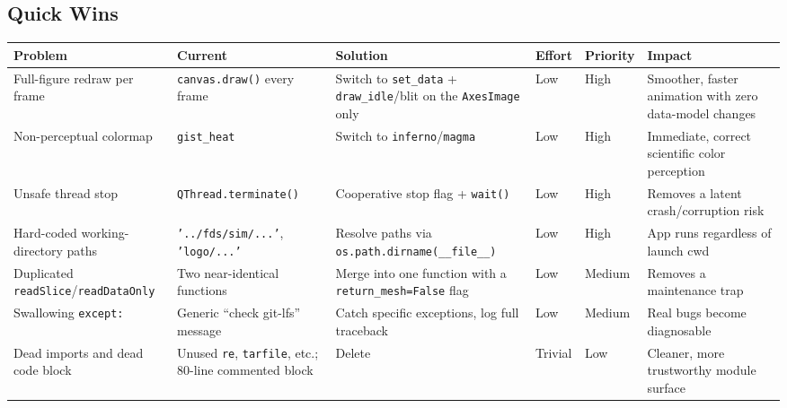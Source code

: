 \documentclass[11pt,a4paper]{report}
\begin{document}
\begin{landscape}
\section{Quick Wins}
\begin{longtable}{p{2.6cm}p{3.4cm}p{3.4cm}p{1.4cm}p{1.2cm}p{2.6cm}}
\toprule
\textbf{Problem} & \textbf{Current} & \textbf{Solution} & \textbf{Effort} & \textbf{Priority} & \textbf{Impact} \\
\midrule
Full-figure redraw per frame & \texttt{canvas.draw()} every frame & Switch to \texttt{set\_data} + \texttt{draw\_idle}/blit on the \texttt{AxesImage} only & Low & High & Smoother, faster animation with zero data-model changes \\
Non-perceptual colormap & \texttt{gist\_heat} & Switch to \texttt{inferno}/\texttt{magma} & Low & High & Immediate, correct scientific color perception \\
Unsafe thread stop & \texttt{QThread.terminate()} & Cooperative stop flag + \texttt{wait()} & Low & High & Removes a latent crash/corruption risk \\
Hard-coded working-directory paths & \texttt{'../fds/sim/...'}, \texttt{'logo/...'} & Resolve paths via \texttt{os.path.dirname(\_\_file\_\_)} & Low & High & App runs regardless of launch cwd \\
Duplicated \texttt{readSlice}/\texttt{readDataOnly} & Two near-identical functions & Merge into one function with a \texttt{return\_mesh=False} flag & Low & Medium & Removes a maintenance trap \\
Swallowing \texttt{except:} & Generic ``check git-lfs'' message & Catch specific exceptions, log full traceback & Low & Medium & Real bugs become diagnosable \\
Dead imports and dead code block & Unused \texttt{re}, \texttt{tarfile}, etc.; 80-line commented block & Delete & Trivial & Low & Cleaner, more trustworthy module surface \\
\bottomrule
\end{longtable}


\end{landscape}
\end{document}
